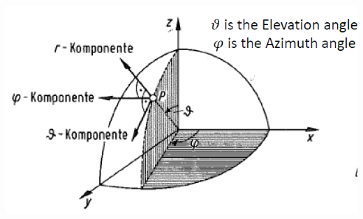 \begin{minipage}{8cm}
	\includegraphics[width=1\textwidth]{./images/Antenna_Pattern.png}\\
\end{minipage}

